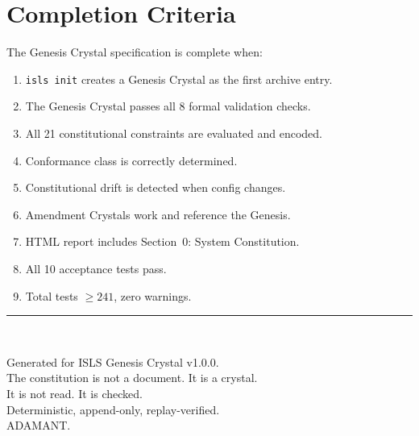 \documentclass[11pt,a4paper,twoside]{article}
\theoremstyle{definition}
\theoremstyle{plain}
\theoremstyle{remark}
\newcommand{\ISLS}{\textsf{ISLS}}
\newcommand{\ADAMANT}{\textsf{ADAMANT}}
\begin{document}
\section{Completion Criteria}

The Genesis Crystal specification is complete when:
\begin{enumerate}[nosep]
  \item \texttt{isls init} creates a Genesis Crystal as the first
        archive entry.
  \item The Genesis Crystal passes all 8 formal validation checks.
  \item All 21 constitutional constraints are evaluated and encoded.
  \item Conformance class is correctly determined.
  \item Constitutional drift is detected when config changes.
  \item Amendment Crystals work and reference the Genesis.
  \item HTML report includes Section~0: System Constitution.
  \item All 10 acceptance tests pass.
  \item Total tests $\ge 241$, zero warnings.
\end{enumerate}


\vfill
\begin{center}
\rule{0.5\textwidth}{0.4pt}\\[0.5cm]


\vspace{0.3cm}
{\small Generated for \ISLS{} Genesis Crystal v1.0.0.\\
The constitution is not a document. It is a crystal.\\
It is not read. It is checked.\\[0.3cm]
Deterministic, append-only, replay-verified.\\
\ADAMANT{}.}
\end{center}
\end{document}

